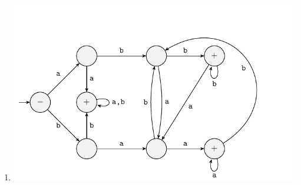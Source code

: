 \begin{solution}
\begin{enumerate}[label=\textbf{\alph*)}]
        \\
        \item \includegraphics[]{figures/answer/Answer1-F.pdf}
    \end{enumerate}
\end{solution}


